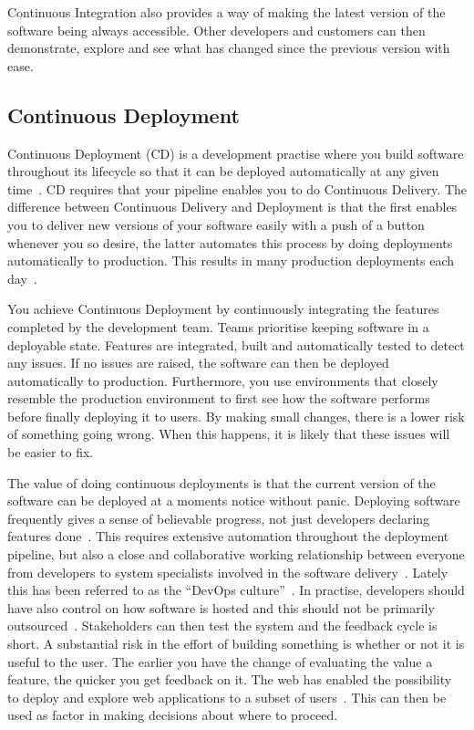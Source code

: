 \documentclass[english]{tktltiki2}
\begin{document}
Continuous Integration also provides a way of making the latest version of the software being always accessible. Other developers and customers can then demonstrate, explore and see what has changed since the previous version with ease.

\subsection{Continuous Deployment}

Continuous Deployment (CD) is a development practise where you build software throughout its lifecycle so that it can be deployed automatically at any given time~\cite{Fow13a}. CD requires that your pipeline enables you to do Continuous Delivery. The difference between Continuous Delivery and Deployment is that the first enables you to deliver new versions of your software easily with a push of a button whenever you so desire, the latter automates this process by doing deployments automatically to production. This results in many production deployments each day~\cite{OR11, Sny13, Rub14}.

You achieve Continuous Deployment by continuously integrating the features completed by the development team. Teams prioritise keeping software in a deployable state. Features are integrated, built and automatically tested to detect any issues. If no issues are raised, the software can then be deployed automatically to production. Furthermore, you use environments that closely resemble the production environment to first see how the software performs before finally deploying it to users. By making small changes, there is a lower risk of something going wrong. When this happens, it is likely that these issues will be easier to fix.

The value of doing continuous deployments is that the current version of the software can be deployed at a moments notice without panic. Deploying software frequently gives a sense of believable progress, not just developers declaring features done~\cite{Fow13a}. This requires extensive automation throughout the deployment pipeline, but also a close and collaborative working relationship between everyone from developers to system specialists involved in the software delivery~\cite{Fow13a}. Lately this has been referred to as the “DevOps culture”~\cite{Fow13a}. In practise, developers should have also control on how software is hosted and this should not be primarily outsourced~\cite{HF11}. Stakeholders can then test the system and the feedback cycle is short. A substantial risk in the effort of building something is whether or not it is useful to the user. The earlier you have the change of evaluating the value a feature, the quicker you get feedback on it. The web has enabled the possibility to deploy and explore web applications to a subset of users~\cite{Fow06, Fow13a}. This can then be used as factor in making decisions about where to proceed.
\end{document}
